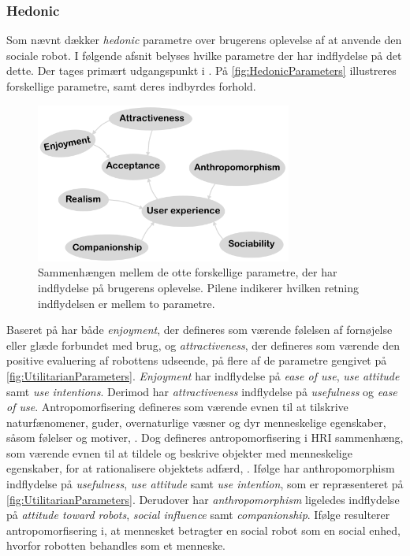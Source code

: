 \subsubsection*{Hedonic}
\label{InteraktionSocialeRobotterParametreHedonic}
%
Som nævnt dækker \textit{hedonic} parametre over brugerens oplevelse af at anvende den sociale robot. I følgende afsnit belyses hvilke parametre der har indflydelse på det dette. Der tages primært udgangspunkt i \textcite[ss. 1477-1478]{PDF:SharingALifeHarvey}. På \autoref{fig:HedonicParameters} illustreres forskellige parametre, samt deres indbyrdes forhold.
%
\begin{figure}[H]
\centering
\includegraphics[width = 0.75\textwidth]{Figure/HedonicParameters} 
\caption{Sammenhængen mellem de otte forskellige parametre, der har indflydelse på brugerens oplevelse. Pilene indikerer hvilken retning indflydelsen er mellem to parametre.}
\label{fig:HedonicParameters}
\end{figure}
\noindent 
%
Baseret på \textcite[s. 1477]{PDF:ExploringInfluencingVariable} har både \textit{enjoyment}, der defineres som værende følelsen af fornøjelse eller glæde forbundet med brug, og \textit{attractiveness}, der defineres som værende den positive evaluering af robottens udseende, på flere af de parametre gengivet på \autoref{fig:UtilitarianParameters}. \textit{Enjoyment} har indflydelse på \textit{ease of use}, \textit{use attitude} samt \textit{use intentions}. Derimod har \textit{attractiveness} indflydelse på \textit{usefulness} og \textit{ease of use}. \blankline 
%
Antropomorfisering defineres som værende evnen til at tilskrive naturfænomener, guder, overnaturlige væsner og dyr menneskelige egenskaber, såsom følelser og motiver, \parencite{WEB:DefAntropomorisering}. Dog defineres antropomorfisering i HRI sammenhæng, som værende evnen til at tildele og beskrive objekter med menneskelige egenskaber, for at rationalisere objektets adfærd, \parencite[s. 1478]{PDF:ExploringInfluencingVariable}. Ifølge \textcite[s. 1478]{PDF:ExploringInfluencingVariable} har anthropomorphism indflydelse på \textit{usefulness}, \textit{use attitude} samt \textit{use intention}, som er repræsenteret på \autoref{fig:UtilitarianParameters}. Derudover har \textit{anthropomorphism} ligeledes indflydelse på \textit{attitude toward robots}, \textit{social influence} samt \textit{companionship}. Ifølge \textcite[s. 19]{PDF:CloseButNotStuck} resulterer antropomorfisering i, at mennesket betragter en social robot som en social enhed, hvorfor robotten behandles som et menneske.

